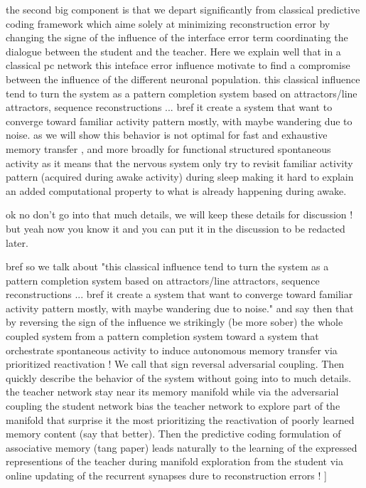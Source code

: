 \documentclass[10pt,letterpaper]{article}
\theoremstyle{plain}
\theoremstyle{remark}
\begin{document}
the second big component is that we depart significantly from classical predictive coding framework which aime solely at minimizing reconstruction error by changing the signe of the influence of the interface error term coordinating the dialogue between the student and the teacher.
Here we explain well that in a classical pc network this inteface error influence motivate to find a compromise between the influence of the different neuronal population. this classical influence tend to turn the system as a pattern completion system based on attractors/line attractors, sequence reconstructions ... bref it create a system that want to converge toward familiar activity pattern mostly, with maybe wandering due to noise. as we will show this behavior is not optimal for fast and exhaustive memory transfer , and more broadly for functional structured spontaneous activity as it means that the nervous system only try to revisit familiar activity pattern (acquired during awake activity) during sleep making it hard to explain an added computational property to what is already happening during awake.

ok no don't go into that much details, we will keep these details for discussion ! but yeah now you know it and you can put it in the discussion to be redacted later. 

bref so we talk about "this classical influence tend to turn the system as a pattern completion system based on attractors/line attractors, sequence reconstructions ... bref it create a system that want to converge toward familiar activity pattern mostly, with maybe wandering due to noise." and say then that by reversing the sign of the influence we strikingly (be more sober) the whole coupled system from a pattern completion system toward a system that orchestrate spontaneous activity to induce autonomous memory transfer via prioritized reactivation !  We call that sign reversal adversarial coupling.
Then quickly describe the behavior  of the system without going into to much details.
the teacher network stay near its memory manifold while via the adversarial coupling the student network bias the teacher network to explore part of the manifold that surprise it the most prioritizing the reactivation of poorly learned memory content (say that better). Then the predictive coding formulation of associative memory (tang paper) leads naturally to the learning of the expressed representions of the teacher during manifold exploration from the student via online updating of the recurrent synapses dure to reconstruction errors ! 
]
\end{document}
